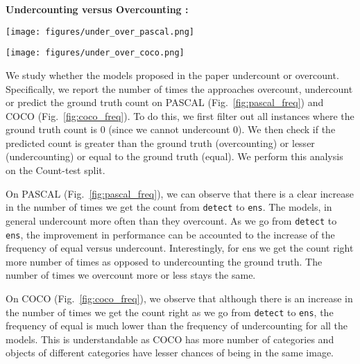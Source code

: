 \documentclass[10pt,twocolumn,letterpaper]{article}
\newcommand{\detect}{\texttt{detect}\xspace}
\newcommand{\sub}{\texttt{aso-sub}\xspace}
\newcommand{\seq}{\texttt{seq-sub}\xspace}
\newcommand{\glance}{\texttt{glance}\xspace}
\newcommand{\ens}{\texttt{ens}\xspace}
\newcommand{\reffig}[1]{Fig.~\ref{#1}}
\begin{document}
\textbf{Undercounting versus Overcounting : }
\begin{figure*}
\texttt{[image: figures/under\_over\_pascal.png]}
\caption{We plot the percentage number of times \ens (ens), \seq (seq), \sub(aso), \glance (gl) and \detect (det) undercount, overcount and predict the ground truth count on PASCAL Count-test split. Going from \detect to \ens there is a steady increase in the number of times we get the count right.}
\label{fig:pascal_freq}
\end{figure*}
\begin{figure*}
\texttt{[image: figures/under\_over\_coco.png]}
\caption{We plot the percentage number of times \ens (ens), \seq (seq), \sub(aso), \glance (gl) and \detect (det) undercount, overcount and predict the ground truth count on COCO Count-test split. Although, going from \detect to \ens there is a steady increase in the number of times we get the count right but we undercount a lot more than getting the count right.}
\label{fig:coco_freq}
\end{figure*}
We study whether the models proposed in the paper undercount or overcount. Specifically, we report the number of times the approaches overcount, undercount or predict the ground truth count on PASCAL (\reffig{fig:pascal_freq}) and COCO (\reffig{fig:coco_freq}). To do this, we first filter out all instances where the ground truth count is 0 (since we cannot undercount 0). We then check if the predicted count is greater than the ground truth (overcounting) or lesser (undercounting) or equal to the ground truth (equal). We perform this analysis on the Count-test split. 

On PASCAL (\reffig{fig:pascal_freq}), we can observe that there is a clear increase in the number of times we get the count from \detect to \ens. The models, in general undercount more often than they overcount. As we go from \detect to \ens, the improvement in performance can be accounted to the increase of the frequency of equal versus undercount. Interestingly, for ens we get the count right more number of times as opposed to undercounting the ground truth. The number of times we overcount more or less stays the same.

On COCO (\reffig{fig:coco_freq}), we observe that although there is an increase in the number of times we get the count right as we go from \detect to \ens, the frequency of equal is much lower than the frequency of undercounting for all the models. This is understandable as COCO has more number of categories and objects of different categories have lesser chances of being in the same image.
\end{document}
